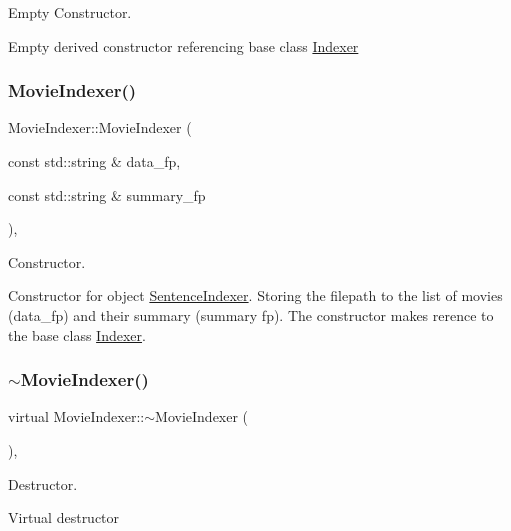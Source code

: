 Empty Constructor. 

Empty derived constructor referencing base class \hyperlink{class_indexer}{Indexer} \mbox{\label{class_movie_indexer_a9368e9bb63e2a854718521fa975102d2}} 
\subsubsection{\texorpdfstring{Movie\+Indexer()}{MovieIndexer()}\hspace{0.1cm}{\footnotesize\ttfamily [2/2]}}
{\footnotesize\ttfamily Movie\+Indexer\+::\+Movie\+Indexer (\begin{DoxyParamCaption}\item[{const std\+::string \&}]{data\+\_\+fp,  }\item[{const std\+::string \&}]{summary\+\_\+fp }\end{DoxyParamCaption})\hspace{0.3cm}{\ttfamily [inline]}, {\ttfamily [explicit]}}



Constructor. 

Constructor for object \hyperlink{class_sentence_indexer}{Sentence\+Indexer}. Storing the filepath to the list of movies (data\+\_\+fp) and their summary (summary fp). The constructor makes rerence to the base class \hyperlink{class_indexer}{Indexer}. \mbox{\label{class_movie_indexer_a9034e6e0568a3334ea42b23f9dc14dd4}} 
\subsubsection{\texorpdfstring{$\sim$\+Movie\+Indexer()}{~MovieIndexer()}}
{\footnotesize\ttfamily virtual Movie\+Indexer\+::$\sim$\+Movie\+Indexer (\begin{DoxyParamCaption}{ }\end{DoxyParamCaption})\hspace{0.3cm}{\ttfamily [inline]}, {\ttfamily [virtual]}}



Destructor. 

Virtual destructor 

